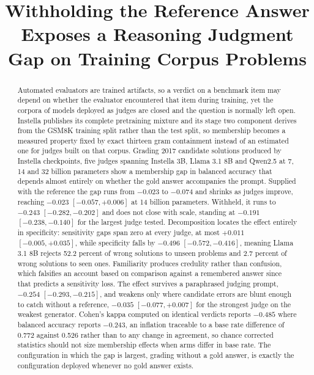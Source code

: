 \documentclass{article}
\title{Withholding the Reference Answer Exposes a Reasoning Judgment Gap
       on Training Corpus Problems}
\begin{document}
\maketitle

\begin{abstract}
Automated evaluators are trained artifacts, so a verdict on a benchmark item may depend on
whether the evaluator encountered that item during training, yet the corpora of models
deployed as judges are closed and the question is normally left open. Instella publishes its
complete pretraining mixture and its stage two component derives from the GSM8K training
split rather than the test split, so membership becomes a measured property fixed by exact
thirteen gram containment instead of an estimated one for judges built on that corpus. Grading 2017 candidate solutions
produced by Instella checkpoints, five judges spanning Instella 3B, Llama 3.1 8B and
Qwen2.5 at 7, 14 and 32 billion parameters show a membership gap in balanced accuracy that
depends almost entirely on whether the gold answer accompanies the prompt. Supplied with the
reference the gap runs from $-0.023$ to $-0.074$ and shrinks as judges improve, reaching
$-0.023$ $[-0.057, +0.006]$ at 14 billion parameters. Withheld, it runs to $-0.243$
$[-0.282, -0.202]$ and does not close with scale, standing at $-0.191$ $[-0.238, -0.140]$
for the largest judge tested. Decomposition locates the effect entirely in specificity:
sensitivity gaps span zero at every judge, at most $+0.011$ $[-0.005, +0.035]$, while
specificity falls by $-0.496$ $[-0.572, -0.416]$, meaning Llama 3.1 8B rejects 52.2 percent
of wrong solutions to unseen problems and 2.7 percent of wrong solutions to seen ones.
Familiarity produces credulity rather than confusion, which falsifies an account based on
comparison against a remembered answer since that predicts a sensitivity loss. The effect
survives a paraphrased judging prompt, $-0.254$ $[-0.293, -0.215]$, and weakens only where
candidate errors are blunt enough to catch without a reference, $-0.035$ $[-0.077, +0.007]$
for the strongest judge on the weakest generator. Cohen's kappa computed on identical
verdicts reports $-0.485$ where balanced accuracy reports $-0.243$, an inflation traceable
to a base rate difference of 0.772 against 0.526 rather than to any change in agreement, so
chance corrected statistics should not size membership effects when arms differ in base rate.
The configuration in which the gap is largest, grading without a gold answer, is exactly the
configuration deployed whenever no gold answer exists.
\end{abstract}
\end{document}

